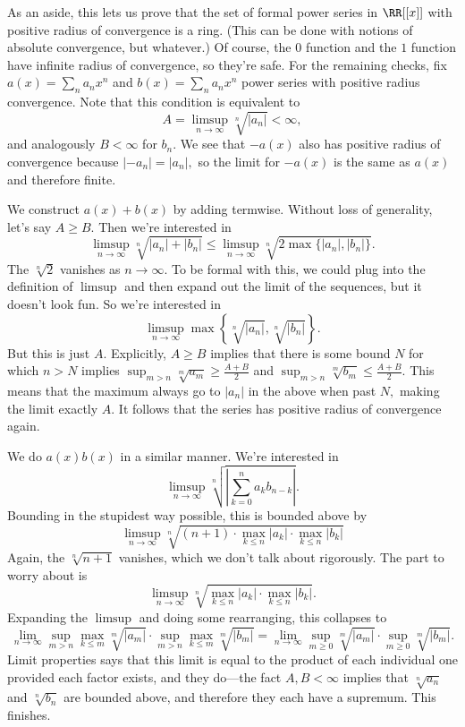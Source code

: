 As an aside, this lets us prove that the set of formal power series in $\RR[[x]]$ with positive radius of convergence is a ring. (This can be done with notions of absolute convergence, but whatever.) Of course, the $0$ function and the $1$ function have infinite radius of convergence, so they're safe. For the remaining checks, fix $a(x)=\sum_na_nx^n$ and $b(x)=\sum_na_nx^n$ power series with positive radius convergence. Note that this condition is equivalent to
\[A=\limsup_{n\to\infty}\sqrt[n]{|a_n|}<\infty,\]
and analogously $B<\infty$ for $b_n.$ We see that $-a(x)$ also has positive radius of convergence because $|-a_n|=|a_n|,$ so the limit for $-a(x)$ is the same as $a(x)$ and therefore finite.

We construct $a(x)+b(x)$ by adding termwise. Without loss of generality, let's say $A\ge B.$ Then we're interested in
\[\limsup_{n\to\infty}\sqrt[n]{|a_n|+|b_n|}\le\limsup_{n\to\infty}\sqrt[n]{2\max\{|a_n|,|b_n|\}}.\]
The $\sqrt[n]2$ vanishes as $n\to\infty.$ To be formal with this, we could plug into the definition of $\limsup$ and then expand out the limit of the sequences, but it doesn't look fun. So we're interested in
\[\limsup_{n\to\infty}\max\left\{\sqrt[n]{|a_n|},\sqrt[n]{|b_n|}\right\}.\]
But this is just $A.$ Explicitly, $A\ge B$ implies that there is some bound $N$ for which $n>N$ implies $\sup_{m>n}\sqrt[m]{a_m}\ge\frac{A+B}2$ and $\sup_{m>n}\sqrt[m]{b_m}\le\frac{A+B}2.$ This means that the maximum always go to $|a_n|$ in the above when past $N,$ making the limit exactly $A.$ It follows that the series has positive radius of convergence again.

We do $a(x)b(x)$ in a similar manner. We're interested in
\[\limsup_{n\to\infty}\sqrt[n]{\left|\sum_{k=0}^na_kb_{n-k}\right|}.\]
Bounding in the stupidest way possible, this is bounded above by
\[\limsup_{n\to\infty}\sqrt[n]{(n+1)\cdot\max_{k\le n}|a_k|\cdot\max_{k\le n}|b_k|}\]
Again, the $\sqrt[n]{n+1}$ vanishes, which we don't talk about rigorously. The part to worry about is
\[\limsup_{n\to\infty}\sqrt[n]{\max_{k\le n}|a_k|\cdot\max_{k\le n}|b_k|}.\]
Expanding the $\limsup$ and doing some rearranging, this collapses to
\[\lim_{n\to\infty}\sup_{m>n}\max_{k\le m}\sqrt[m]{|a_m|}\cdot\sup_{m>n}\max_{k\le m}\sqrt[m]{|b_m|}=\lim_{n\to\infty}\sup_{m\ge0}\sqrt[m]{|a_m|}\cdot\sup_{m\ge0}\sqrt[m]{|b_m|}.\]
Limit properties says that this limit is equal to the product of each individual one provided each factor exists, and they do---the fact $A,B<\infty$ implies that $\sqrt[n]{a_n}$ and $\sqrt[n]{b_n}$ are bounded above, and therefore they each have a supremum. This finishes.

